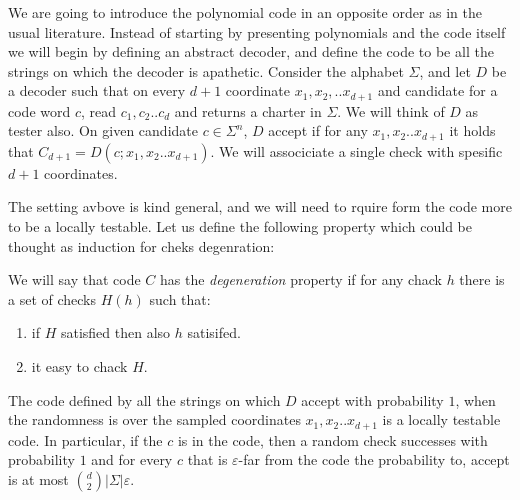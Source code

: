 
\newcommand{\FF}{\mathbb{F}_{q}}
\newcommand{\VV}{\sum_{t}{V(x + w^{t}y)}}
We are going to introduce the polynomial code in an opposite order as in the usual literature. Instead of starting by presenting polynomials and the code itself we will begin by defining an abstract decoder, and define the code to be all the strings on which the decoder is apathetic. Consider the alphabet $\Sigma$, and let $D$ be a decoder such that on every $d+1$ coordinate $x_1,x_2, .. x_{d+1}$ and candidate for a code word $c$, read $c_1, c_2 .. c_{d}$ and returns a charter in $\Sigma$. We will think of $D$ as tester also. On given candidate $c \in \Sigma^{n}$, $D$ accept if for any $x_1,x_2.. x_{d+1}$ it holds that $C_{d+1} = D\left(c; x_1, x_2 .. x_{d+1} \right)$. We will associciate a single check with spesific $d+1$ coordinates.   

The setting avbove is kind general, and we will need to rquire form the code more to be a locally testable. Let us define the following property which could be thought as induction for cheks degenration:

\begin{definition}
  We will say that code $C$ has the \textit{degeneration} property if for any chack $h$ there is a set of checks $H\left( h \right)$ such that: 
  \begin{enumerate}
    \item if $H$ satisfied then also $h$ satisifed. 
    \item it easy to chack $H$.  
  \end{enumerate} 
\end{definition}

 

\begin{claim}The code defined by all the strings on which $D$ accept with probability $1$, when the randomness is over the sampled coordinates $x_{1}, x_{2} .. x_{d+1}$ is a locally testable code. In particular, if the $c$ is in the code, then a random check successes with probability $1$ and for every $c$ that is $\varepsilon$-far from the code the probability to, accept  is at most $ { d \choose 2 } |\Sigma| \varepsilon $.  
\end{claim}

